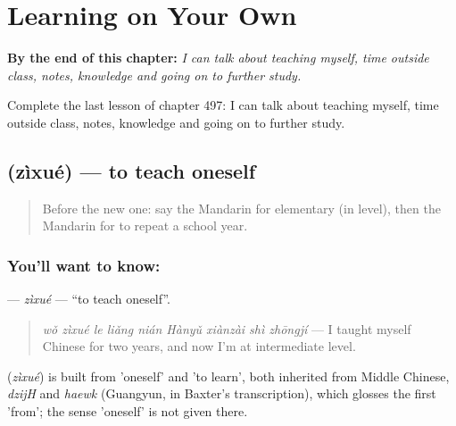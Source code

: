 
\chapter{Learning on Your Own}
\label{ch:zh-learning-on-your-own}

\begin{chapteropening}
\textbf{By the end of this chapter:} \emph{I can talk about teaching myself, time outside class, notes, knowledge and going on to further study.}

Complete the last lesson of chapter 497: I can talk about teaching myself, time outside class, notes, knowledge and going on to further study.
\end{chapteropening}

\section[\texorpdfstring{\zh{自学} (zìxué)}{自学 (zìxué)}]{ (zìxué) — to teach oneself}

\label{lesson:ZH-C497-zixue}



\begin{quote}
Before the new one: say the Mandarin for elementary (in level), then the Mandarin for to repeat a school year.
\end{quote}

\subsection*{You'll want to know: }
\textbf{} — \emph{zìxué} — \textquotedblleft{}to teach oneself\textquotedblright{}.

\begin{quote}
\textbf{} \emph{wǒ zìxué le liǎng nián Hànyǔ xiànzài shì zhōngjí} — I taught myself Chinese for two years, and now I'm at intermediate level.
\end{quote}

\begin{cousinweb}
\textbf{} (\emph{zìxué}) is built from  'oneself' and  'to learn', both inherited from Middle Chinese, \emph{dzijH} and \emph{haewk} (Guangyun, in Baxter's transcription), which glosses the first 'from'; the sense 'oneself' is not given there.
\end{cousinweb}

